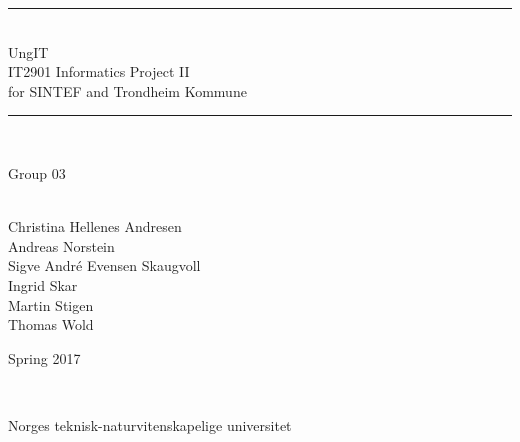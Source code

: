 \thispagestyle{empty}
\begin{center}


\noindent\rule{\textwidth}{1.3pt}
\\[1pc]
\Huge{UngIT}
\\[1pc]
\large{IT2901 Informatics Project II  \\for SINTEF and Trondheim Kommune}
\\[1pc]
\noindent\rule{\textwidth}{1.3pt}
\\[6pc]

\begin{bf}\Large{Group 03}\end{bf}
\\[1pc]

Christina Hellenes Andresen\\
Andreas Norstein\\
Sigve André Evensen Skaugvoll\\
Ingrid Skar\\
Martin Stigen\\
Thomas Wold\\
[4pc]


\begin{bf}
Spring 2017
\end{bf}
\\[8pc]


\begin{small}Norges teknisk-naturvitenskapelige universitet\end{small}

\end{center}

\pagebreak
